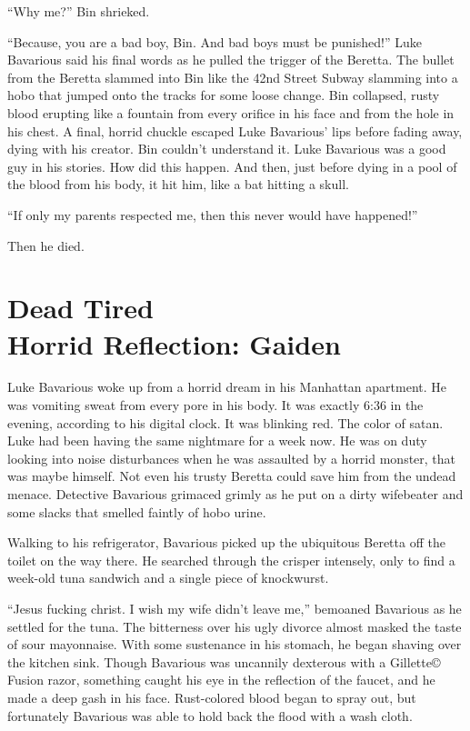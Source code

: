 ``Why me?'' Bin shrieked.

``Because, you are a bad boy, Bin. And bad boys must be
punished!'' Luke Bavarious said his final words as he pulled
the trigger of the Beretta. The bullet from the Beretta slammed
into Bin like the 42nd Street Subway slamming into a hobo that
jumped onto the tracks for some loose change. Bin collapsed, rusty
blood erupting like a fountain from every orifice in his face and
from the hole in his chest. A final, horrid chuckle escaped Luke
Bavarious' lips before fading away, dying with his creator.
Bin couldn't understand it. Luke Bavarious was a good guy in
his stories. How did this happen. And then, just before dying in a
pool of the blood from his body, it hit him, like a bat hitting a
skull.

``If only my parents respected me, then this never would have
happened!''

Then he died. 
 



\chapter[Dead Tired]{Dead Tired\\Horrid Reflection: Gaiden}



Luke Bavarious woke up from a horrid dream in his Manhattan
apartment. He was vomiting sweat from every pore in his body. It
was exactly 6:36 in the evening, according to his digital clock. It
was blinking red. The color of satan. Luke had been having the same
nightmare for a week now. He was on duty looking into noise
disturbances when he was assaulted by a horrid monster, that was
maybe himself. Not even his trusty Beretta could save him from the
undead menace. Detective Bavarious grimaced grimly as he put on a
dirty wifebeater and some slacks that smelled faintly of hobo
urine.



Walking to his refrigerator, Bavarious picked up the ubiquitous
Beretta off the toilet on the way there. He searched through the
crisper intensely, only to find a week-old tuna sandwich and a
single piece of knockwurst.



``Jesus fucking christ. I wish my wife didn't leave me,'' bemoaned
Bavarious as he settled for the tuna. The bitterness over his ugly
divorce almost masked the taste of sour mayonnaise. With some
sustenance in his stomach, he began shaving over the kitchen sink.
Though Bavarious was uncannily dexterous with a Gillette{\copyright}
Fusion razor, something caught his eye in the reflection of the
faucet, and he made a deep gash in his face. Rust-colored blood
began to spray out, but fortunately Bavarious was able to hold back
the flood with a wash cloth.




